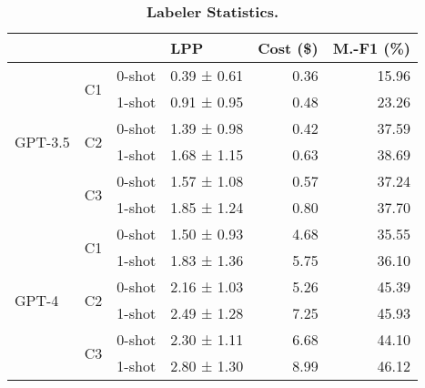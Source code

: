 \begin{table}[!ht]
\centering
\caption{\textbf{Labeler Statistics.}}
\label{tab:labeler-results}
\begin{tabular}{llllrr}
\toprule
 &  &  & LPP & Cost (\$) & M.-F1 (\%) \\
\midrule
\multirow[c]{6}{*}{GPT-3.5} & \multirow[c]{2}{*}{C1} & 0-shot & 0.39 ± 0.61 & 0.36 & 15.96 \\
 &  & 1-shot & 0.91 ± 0.95 & 0.48 & 23.26 \\
\cline{2-6}
 & \multirow[c]{2}{*}{C2} & 0-shot & 1.39 ± 0.98 & 0.42 & 37.59 \\
 &  & 1-shot & 1.68 ± 1.15 & 0.63 & 38.69 \\
\cline{2-6}
 & \multirow[c]{2}{*}{C3} & 0-shot & 1.57 ± 1.08 & 0.57 & 37.24 \\
 &  & 1-shot & 1.85 ± 1.24 & 0.80 & 37.70 \\
\cline{1-6} \cline{2-6}
\multirow[c]{6}{*}{GPT-4} & \multirow[c]{2}{*}{C1} & 0-shot & 1.50 ± 0.93 & 4.68 & 35.55 \\
 &  & 1-shot & 1.83 ± 1.36 & 5.75 & 36.10 \\
\cline{2-6}
 & \multirow[c]{2}{*}{C2} & 0-shot & 2.16 ± 1.03 & 5.26 & 45.39 \\
 &  & 1-shot & 2.49 ± 1.28 & 7.25 & 45.93 \\
\cline{2-6}
 & \multirow[c]{2}{*}{C3} & 0-shot & 2.30 ± 1.11 & 6.68 & 44.10 \\
 &  & 1-shot & 2.80 ± 1.30 & 8.99 & 46.12 \\
\cline{1-6} \cline{2-6}
\bottomrule
\end{tabular}
\end{table}
